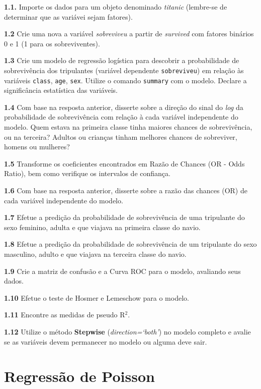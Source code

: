 \documentclass[12pt,brazil,oneside]{book}
\begin{document}
\textbf{1.1.} Importe os dados para um objeto denominado \emph{titanic} (lembre-se de determinar que as variávei sejam fatores).

\textbf{1.2} Crie uma nova a variável \emph{sobreviveu} a partir de \emph{survived} com fatores binários 0 e 1 (1 para os sobreviventes).

\textbf{1.3} Crie um modelo de regressão logística para descobrir a probabilidade de sobrevivência dos tripulantes (variável dependente \texttt{sobreviveu}) em relação às variáveis \texttt{class}, \texttt{age}, \texttt{sex}. Utilize o comando \texttt{summary} com o modelo. Declare a significância estatística das variáveis.

\textbf{1.4} Com base na resposta anterior, disserte sobre a direção do sinal do \emph{log} da probabilidade de sobrevivência com relação à cada variável independente do modelo. Quem estava na primeira classe tinha maiores chances de sobrevivência, ou na terceira? Adultos ou crianças tinham melhores chances de sobreviver, homens ou mulheres?

\textbf{1.5} Transforme os coeficientes encontrados em Razão de Chances (OR - Odds Ratio), bem como verifique os intervalos de confiança.

\textbf{1.6} Com base na resposta anterior, disserte sobre a razão das chances (OR) de cada variável independente do modelo.

\textbf{1.7} Efetue a predição da probabilidade de sobrevivência de uma tripulante do sexo feminino, adulta e que viajava na primeira classe do navio.

\textbf{1.8} Efetue a predição da probabilidade de sobrevivência de um tripulante do sexo masculino, adulto e que viajava na terceira classe do navio.

\textbf{1.9} Crie a matriz de confusão e a Curva ROC para o modelo, avaliando seus dados.

\textbf{1.10} Efetue o teste de Hosmer e Lemeschow para o modelo.

\textbf{1.11} Encontre as medidas de pseudo R\(^2\).

\textbf{1.12} Utilize o método \textbf{Stepwise} (\emph{direction=`both'}) no modelo completo e avalie se as variáveis devem permanecer no modelo ou alguma deve sair.

\hypertarget{regressao-de-poisson}{%
\chapter{Regressão de Poisson}\label{regressao-de-poisson}}
\end{document}
